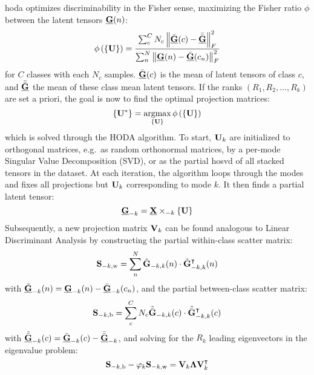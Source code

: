\documentclass[twocolumn]{article}
\begin{document}
\Ac{hoda} optimizes discriminability in the Fisher sense, maximizing the Fisher
ratio $\phi$ between the latent tensors $\ten{G}(n)$:
\begin{equation}
	\phi\left(\left\{\mat{U}\right\}\right) = \frac{\sum_c^CN_c\left\|\bar{\ten{G}}(c)-\bar{\bar{\ten{G}}}\right\|_F^2}
	{\sum_n^N\left\|\ten{G}(n)-\bar{\ten{G}}(c_n)\right\|_F^2}
	\label{eq:fisher}
\end{equation}
for $C$ classes with each $N_c$ samples. $\bar{\ten{G}}(c)$ is the mean of
latent tensors of class $c$, and $\bar{\bar{\ten{G}}}$ the mean of
these class mean latent tensors.
If the ranks $(R_1,R_2, \ldots,R_k)$ are set a priori, the goal is now to find the optimal projection matrices:
\begin{equation}
	\left\{\mat{U}^*\right\} =  \argmax_{\{\mat{U}\}}\phi\left(\left\{\mat{U}\right\}\right)
\end{equation}
which is solved through the HODA algorithm.
To start, $\mat{U}_k$ are initialized to orthogonal matrices, e.g.\ as random
orthonormal matrices, by a per-mode Singular Value Decomposition (SVD),
or as the partial \ac{hosvd} of all stacked tensors in the dataset.
At each iteration, the algorithm loops through the modes and fixes all
projections but $\mat{U}_k$ corresponding to mode $k$.
It then finds a partial latent tensor:
\begin{equation}
	\ten{G}_{-k}=\ten{X}\mmprs{\mat{U}}{k}
\end{equation}
Subsequently, a new projection matrix $\mat{V}_k$ can be found analogous to Linear
Discriminant Analysis by constructing the partial within-class scatter matrix:
\begin{equation}
	\mat{S}_{-k,\text{w}} = \sum_n^N\tilde{\mat{G}}_{-k,k}(n)\cdot\tilde{\mat{G}}_{-k,k}^\intercal(n)
\end{equation}
with $\tilde{\ten{G}}_{-k}(n) = \ten{G}_{-k}(n) - \bar{\ten{G}}_{-k}(c_n)$,
and the partial between-class scatter matrix:
\begin{equation}
	\mat{S}_{-k,\text{b}} =
	\sum_c^CN_c\tilde{\bar{\mat{G}}}_{-k,k}(c)\cdot\tilde{\bar{\mat{G}}}_{-k,k}^\intercal(c)
\end{equation}
with $\tilde{\bar{\ten{G}}}_{-k}(c) = \bar{\ten{G}}_{-k}(c) - \bar{\bar{\ten{G}}}_{-k}$,
and solving for the $R_k$ leading eigenvectors in the eigenvalue problem:
\begin{equation}
	\mat{S}_{-k,\text{b}}-\varphi_k\mat{S}_{-k,\text{w}} =
	\mat{V}_k\mat{\Lambda}\mat{V}_k^\intercal
\end{equation}
\end{document}
